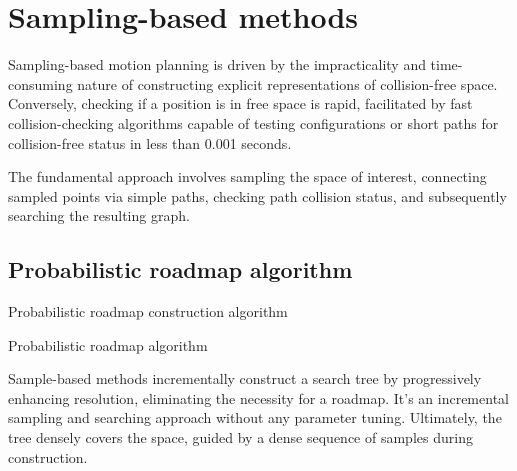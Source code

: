 \section{Sampling-based methods}

Sampling-based motion planning is driven by the impracticality and time-consuming nature of constructing explicit representations of collision-free space.
Conversely, checking if a position is in free space is rapid, facilitated by fast collision-checking algorithms capable of testing configurations or short paths for collision-free status in less than 0.001 seconds.

The fundamental approach involves sampling the space of interest, connecting sampled points via simple paths, checking path collision status, and subsequently searching the resulting graph.

\subsection{Probabilistic roadmap algorithm}
\begin{algorithm}[H]
    \caption{Probabilistic roadmap construction algorithm}
        \begin{algorithmic}[1]
        \end{algorithmic}
\end{algorithm}
\begin{algorithm}[H]
    \caption{Probabilistic roadmap algorithm}
        \begin{algorithmic}[1]
                \Else
                    \Repeat 
                            \State{}
                        \Else 
                        \EndIf
                \EndIf
                    \State{}
                \Else
                    \State{}
                \EndIf
            \EndFor
        \end{algorithmic}
\end{algorithm}
Sample-based methods incrementally construct a search tree by progressively enhancing resolution, eliminating the necessity for a roadmap. 
It's an incremental sampling and searching approach without any parameter tuning. 
Ultimately, the tree densely covers the space, guided by a dense sequence of samples during construction.

